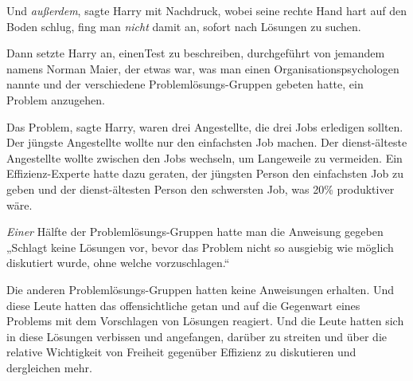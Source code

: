 Und \emph{außerdem}, sagte Harry mit Nachdruck, wobei seine rechte Hand hart auf den Boden schlug, fing man \emph{nicht} damit an, sofort nach Lösungen zu suchen.

Dann setzte Harry an, einenTest zu beschreiben, durchgeführt von jemandem namens Norman Maier, der etwas war, was man einen Organisationspsychologen nannte und der verschiedene Problemlösungs-Gruppen gebeten hatte, ein Problem anzugehen.

Das Problem, sagte Harry, waren drei Angestellte, die drei Jobs erledigen sollten. Der jüngste Angestellte wollte nur den einfachsten Job machen. Der dienst-älteste Angestellte wollte zwischen den Jobs wechseln, um Langeweile zu vermeiden. Ein Effizienz-Experte hatte dazu geraten, der jüngsten Person den einfachsten Job zu geben und der dienst-ältesten Person den schwersten Job, was 20\% produktiver wäre.

\emph{Einer} Hälfte der Problemlösungs-Gruppen hatte man die Anweisung gegeben „Schlagt keine Lösungen vor, bevor das Problem nicht so ausgiebig wie möglich diskutiert wurde, ohne welche vorzuschlagen.“

Die anderen Problemlösungs-Gruppen hatten keine Anweisungen erhalten. Und diese Leute hatten das offensichtliche getan und auf die Gegenwart eines Problems mit dem Vorschlagen von Lösungen reagiert. Und die Leute hatten sich in diese Lösungen verbissen und angefangen, darüber zu streiten und über die relative Wichtigkeit von Freiheit gegenüber Effizienz zu diskutieren und dergleichen mehr.

